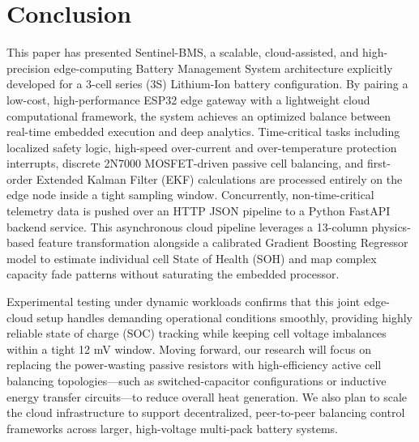 \documentclass[conference]{IEEEtran}
\begin{document}
\section{Conclusion}
This paper has presented Sentinel-BMS, a scalable, cloud-assisted, and high-precision edge-computing Battery Management System architecture explicitly developed for a 3-cell series (3S) Lithium-Ion battery configuration. By pairing a low-cost, high-performance ESP32 edge gateway with a lightweight cloud computational framework, the system achieves an optimized balance between real-time embedded execution and deep analytics. Time-critical tasks including localized safety logic, high-speed over-current and over-temperature protection interrupts, discrete 2N7000 MOSFET-driven passive cell balancing, and first-order Extended Kalman Filter (EKF) calculations are processed entirely on the edge node inside a tight sampling window. Concurrently, non-time-critical telemetry data is pushed over an HTTP JSON pipeline to a Python FastAPI backend service. This asynchronous cloud pipeline leverages a 13-column physics-based feature transformation alongside a calibrated Gradient Boosting Regressor model to estimate individual cell State of Health (SOH) and map complex capacity fade patterns without saturating the embedded processor.

Experimental testing under dynamic workloads confirms that this joint edge-cloud setup handles demanding operational conditions smoothly, providing highly reliable state of charge (SOC) tracking while keeping cell voltage imbalances within a tight 12 mV window. Moving forward, our research will focus on replacing the power-wasting passive resistors with high-efficiency active cell balancing topologies—such as switched-capacitor configurations or inductive energy transfer circuits—to reduce overall heat generation. We also plan to scale the cloud infrastructure to support decentralized, peer-to-peer balancing control frameworks across larger, high-voltage multi-pack battery systems.
\end{document}
